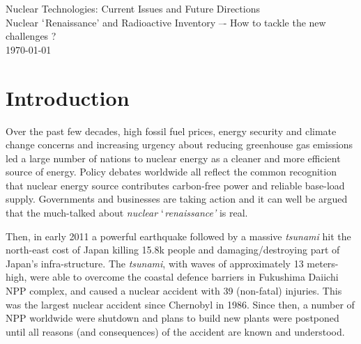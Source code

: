 \documentclass[14pt,twoside]{article}
\begin{document}

\bigskip

\begin{center}
{\Large Nuclear Technologies: Current Issues and Future Directions}\\
{\large Nuclear $\lq$Renaissance' and Radioactive Inventory –- How to tackle the new challenges ?}\\
{\large \today}
\end{center}


\section{Introduction}

Over the past few decades, high fossil fuel prices, energy security and climate change concerns and increasing urgency about reducing greenhouse gas emissions led a large number of nations to nuclear
energy as a cleaner and more efficient source of energy. Policy debates worldwide all reflect the common recognition that nuclear energy source contributes carbon-free power and reliable base-load supply. Governments and businesses are taking action and it can well be argued that the much-talked about {\it nuclear $\lq$renaissance'} is real.  

Then, in early 2011 a powerful earthquake followed by a massive {\it tsunami} hit the north-east cost of Japan killing 15.8k people and damaging/destroying part of Japan's infra-structure. The {\it tsunami}, with waves of approximately 13 meters-high, were able to overcome the coastal defence barriers in Fukushima Daiichi NPP complex, and caused a nuclear accident with 39 (non-fatal) injuries. This was the largest nuclear accident since Chernobyl in 1986. Since then, a number of NPP worldwide were shutdown and plans to build new plants were postponed until all reasons (and consequences) of the accident are known and understood. 
\end{document}
